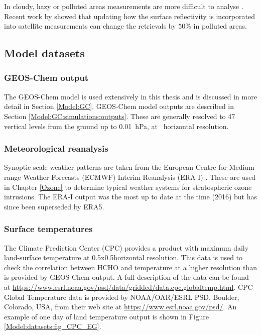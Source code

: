      In cloudy, hazy or polluted areas measurements are more difficult to analyse \parencite[e.g.,][]{Palmer2003,Marais2014}.
      Recent work by \textcite{Vasilkov2017} showed that updating how the surface reflectivity is incorporated into satellite measurements can change the retrievals by $50\%$ in polluted areas.
      
  \subsection{Model datasets}
    
    \subsubsection{GEOS-Chem output}
      
      The GEOS-Chem model is used extensively in this thesis and is discussed in more detail in Section \ref{Model:GC}.
      GEOS-Chem model outputs are described in Section \ref{Model:GC:simulations:outputs}.
      These are generally resolved to 47 vertical levels from the ground up to 0.01~hPa, at \lowhr ~horizontal resolution.
    
    \subsubsection{Meteorological reanalysis}
      \label{Model:datasets:ERAI}
      
      Synoptic scale weather patterns are taken from the European Centre for Medium-range Weather Forecasts (ECMWF) Interim Reanalysis (ERA-I) \parencite{Dee2011}.
      These are used in Chapter \ref{Ozone} to determine typical weather systems for stratospheric ozone intrusions.
      The ERA-I output was the most up to date at the time (2016) but has since been superseded by ERA5.
    
    \subsubsection{Surface temperatures}
    \label{Model:datasets:model:CPC}
      The Climate Prediction Center (CPC) provides a product with maximum daily land-surface temperature at 0.5x0.5\degr  horizontal resolution. 
      This data is used to check the correlation between HCHO and temperature at a higher resolution than is provided by GEOS-Chem output.
      A full description of the data can be found at \url{https://www.esrl.noaa.gov/psd/data/gridded/data.cpc.globaltemp.html}.
      CPC Global Temperature data is provided by NOAA/OAR/ESRL PSD, Boulder, Colorado, USA, from their web site at \url{https://www.esrl.noaa.gov/psd/}.
      An example of one day of land temperature output is shown in Figure \ref{Model:datasets:fig_CPC_EG}.
      
